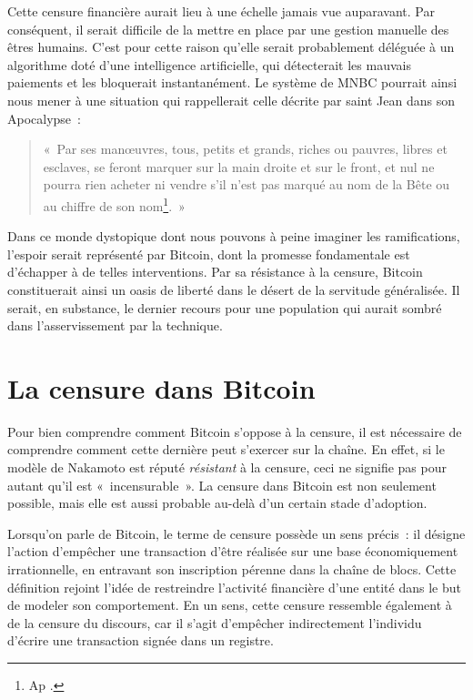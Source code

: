Cette censure financière aurait lieu à une échelle jamais vue auparavant. Par conséquent, il serait difficile de la mettre en place par une gestion manuelle des êtres humains. C'est pour cette raison qu'elle serait probablement déléguée à un algorithme doté d'une intelligence artificielle, qui détecterait les mauvais paiements et les bloquerait instantanément. Le système de MNBC pourrait ainsi nous mener à une situation qui rappellerait celle décrite par saint Jean dans son Apocalypse~:
\vspace{-0.5em}
\begin{quote}
«~Par ses manœuvres, tous, petits et grands, riches ou pauvres, libres et esclaves, se feront marquer sur la main droite et sur le front, et nul ne pourra rien acheter ni vendre s'il n'est pas marqué au nom de la Bête ou au chiffre de son nom\footnote{Ap .}.~»
\end{quote}

Dans ce monde dystopique dont nous pouvons à peine imaginer les ramifications, l'espoir serait représenté par Bitcoin, dont la promesse fondamentale est d'échapper à de telles interventions. Par sa résistance à la censure, Bitcoin constituerait ainsi un oasis de liberté dans le désert de la servitude généralisée. Il serait, en substance, le dernier recours pour une population qui aurait sombré dans l'asservissement par la technique.

\vspace{-1em}
\section*{La censure dans Bitcoin}

Pour bien comprendre comment Bitcoin s'oppose à la censure, il est nécessaire de comprendre comment cette dernière peut s'exercer sur la chaîne. En effet, si le modèle de Nakamoto est réputé \emph{résistant} à la censure, ceci ne signifie pas pour autant qu'il est «~incensurable~». La censure dans Bitcoin est non seulement possible, mais elle est aussi probable au-delà d'un certain stade d'adoption.

Lorsqu'on parle de Bitcoin, le terme de censure possède un sens précis~: il désigne l'action d'empêcher une transaction d'être réalisée sur une base économiquement irrationnelle, en entravant son inscription pérenne dans la chaîne de blocs. Cette définition rejoint l'idée de restreindre l'activité financière d'une entité dans le but de modeler son comportement. En un sens, cette censure ressemble également à de la censure du discours, car il s'agit d'empêcher indirectement l'individu d'écrire une transaction signée dans un registre. %

